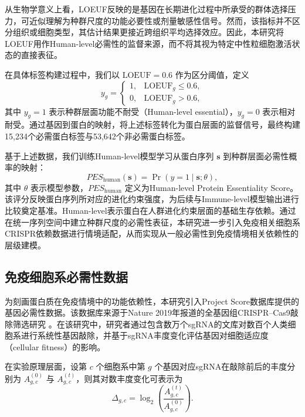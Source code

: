 从生物学意义上看，LOEUF反映的是基因在长期进化过程中所承受的群体选择压力，可近似理解为种群尺度的功能必要性或剂量敏感性信号。然而，该指标并不区分组织或细胞类型，其估计结果更接近跨组织平均选择效应。因此，本研究将LOEUF用作Human-level必需性的监督来源，而不将其视为特定中性粒细胞激活状态的直接表征。

在具体标签构建过程中，我们以 $\mathrm{LOEUF}=0.6$ 作为区分阈值，定义
\begin{equation}
    y_g=
    \begin{cases}
    1, & \mathrm{LOEUF}_g \le 0.6,\\
    0, & \mathrm{LOEUF}_g > 0.6,
    \end{cases}
\end{equation}
其中 $y_g=1$ 表示种群层面功能不耐受（Human-level essential），$y_g=0$ 表示相对耐受。通过基因到蛋白的映射，将上述标签转化为蛋白层面的监督信号，最终构建15,234个必需蛋白标签与53,642个非必需蛋白标签。

基于上述数据，我们训练Human-level模型学习从蛋白序列 $\mathbf{s}$ 到种群层面必需性概率的映射：
\begin{equation}
    PES_{\mathrm{human}}(\mathbf{s}) = \Pr(y=1 \mid \mathbf{s}; \theta),
\end{equation}
其中 $\theta$ 表示模型参数，$PES_{\mathrm{human}}$ 定义为Human-level Protein Essentiality Score。该评分反映蛋白序列所对应的进化约束强度，为后续与Immune-level模型输出进行比较奠定基准。Human-level表示蛋白在人群进化约束层面的基础生存依赖。通过在统一序列空间中建立种群尺度的必需性表征，本研究进一步引入免疫相关细胞系CRISPR依赖数据进行情境适配，从而实现从一般必需性到免疫情境相关依赖性的层级建模。

\subsection{免疫细胞系必需性数据}

为刻画蛋白质在免疫情境中的功能依赖性，本研究引入Project Score数据库提供的基因必需性数据。该数据库来源于Nature 2019年报道的全基因组CRISPR--Cas9敲除筛选研究 \cite{behan2019prioritization}。在该研究中，研究者通过包含数万个sgRNA的文库对数百个人类细胞系进行系统性基因敲除，并基于sgRNA丰度变化评估基因对细胞适应度（cellular fitness）的影响。

在实验原理层面，设第 $c$ 个细胞系中第 $g$ 个基因对应sgRNA在敲除前后的丰度分别为 $A_{g,c}^{(0)}$ 与 $A_{g,c}^{(t)}$，则其对数丰度变化可表示为
\begin{equation}
    \Delta_{g,c} = \log_2 \left( \frac{A_{g,c}^{(t)}}{A_{g,c}^{(0)}} \right).
\end{equation}

